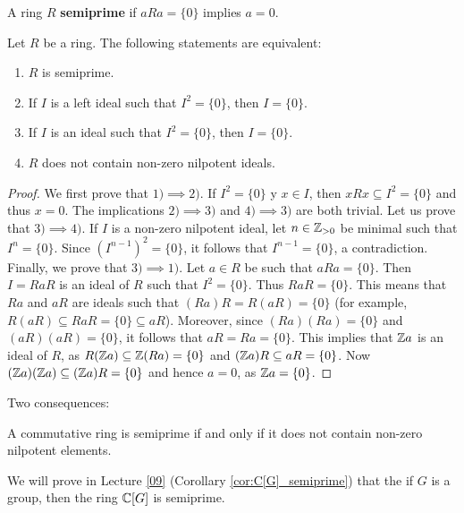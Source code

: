 \begin{definition}
	A ring $R$ \textbf{semiprime} if 
	$aRa=\{0\}$ implies $a=0$.
\end{definition}

\begin{proposition}
	Let $R$ be a ring. The following statements are equivalent: 
	\begin{enumerate}
		\item $R$ is semiprime.
		\item If $I$ is a left ideal such that $I^2=\{0\}$, then $I=\{0\}$.
		\item If $I$ is an ideal such that $I^2=\{0\}$, then $I=\{0\}$.
		\item $R$ does not contain non-zero nilpotent ideals.
	\end{enumerate}
\end{proposition}

\begin{proof}
	We first prove that $1)\implies2)$. If $I^2=\{0\}$ y $x\in I$, then
	$xRx\subseteq I^2=\{0\}$ and thus $x=0$. The implications $2)\implies3)$
	and $4)\implies3)$ are both trivial. Let us prove that $3)\implies4)$.  If
	$I$ is a non-zero nilpotent ideal, let $n\in\mathbb{Z}_{>0}$ be minimal such that
	$I^n=\{0\}$.  Since $(I^{n-1})^2=\{0\}$, it follows that $I^{n-1}=\{0\}$, a
	contradiction.  Finally, we prove that $3)\implies1)$. Let $a\in R$ be such
	that $aRa=\{0\}$. Then $I=RaR$ is an ideal of $R$ such that $I^2=\{0\}$. Thus 
	$RaR=\{0\}$. This means that $Ra$ and $aR$ are ideals such that
	$(Ra)R=R(aR)=\{0\}$ (for example, $R(aR)\subseteq RaR=\{0\}\subseteq aR$). 
	Moreover, since $(Ra)(Ra)=\{0\}$ and $(aR)(aR)=\{0\}$, it follows that
	$aR=Ra=\{0\}$. 
	This implies that $\mathbb{Z} a$ is an ideal of $R$, as $R(\mathbb{Z} a)\subseteq \mathbb{Z}(Ra)=\{0\}$ and 
	$(\mathbb{Z} a)R\subseteq aR=\{0\}$. Now $(\mathbb{Z} a)(\mathbb{Z} a)\subseteq (\mathbb{Z} a)R=\{0\}$ and hence
	$a=0$, as $\mathbb{Z} a=\{0\}$. 
\end{proof}

Two consequences:

\begin{exercise}
	A commutative ring is semiprime if and only if it does not contain non-zero
	nilpotent elements. 
\end{exercise}

We will prove 
in Lecture \ref{09} (Corollary \ref{cor:C[G]_semiprime}) 
that the if $G$ is a group, 
then the ring $\mathbb{C}[G]$ is semiprime. 



